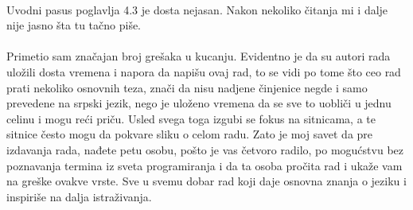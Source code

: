 \documentclass[a4paper]{report}
\begin{document}
\paragraph{}
Uvodni pasus poglavlja 4.3 je dosta nejasan. Nakon nekoliko čitanja mi i dalje nije jasno šta tu tačno piše.
\paragraph{} 
Primetio sam značajan broj grešaka u kucanju. Evidentno je da su autori rada uložili dosta vremena i napora da napišu ovaj rad, to se vidi po tome što ceo rad prati nekoliko osnovnih teza, znači da nisu nadjene činjenice negde i samo prevedene na srpski jezik, nego je uloženo vremena da se sve to uobliči u jednu celinu i mogu reći priču. Usled svega toga izgubi se fokus na sitnicama, a te sitnice često mogu da pokvare sliku o celom radu. Zato je moj savet da pre izdavanja rada, nađete petu osobu, pošto je vas četvoro radilo, po mogućstvu bez poznavanja termina iz sveta programiranja i da ta osoba pročita rad i ukaže vam na greške ovakve vrste.
Sve u svemu dobar rad koji daje osnovna znanja o jeziku i inspiriše na dalja istraživanja.
\end{document}
